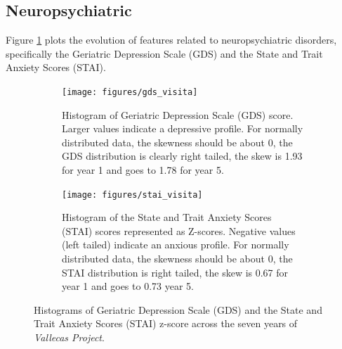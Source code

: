 \documentclass[11pt]{article}
\theoremstyle{definition}
\theoremstyle{remark}
\begin{document}
\subsection{Neuropsychiatric}
\label{sse:neupsy}

Figure \ref{fig:neuropsylong} plots the evolution of features related to neuropsychiatric disorders, specifically the Geriatric Depression Scale (GDS) and the State and Trait Anxiety Scores (STAI). 
\begin{figure}[H]
    \centering
    \begin{subfigure}[t]{0.45\textwidth}
        \centering
        \texttt{[image: figures/gds\_visita]}
        \caption{Histogram of Geriatric Depression Scale (GDS) score. Larger values indicate a depressive profile. For normally distributed data, the skewness should be about 0, the GDS distribution is clearly right tailed, the skew is 1.93 for year 1 and goes to 1.78 for year 5.}%
    \end{subfigure}
    \hfill
    \begin{subfigure}[t]{0.45\textwidth}
        \centering
        \texttt{[image: figures/stai\_visita]}
        \caption{Histogram of the State and Trait Anxiety Scores (STAI) scores represented as Z-scores. Negative values (left tailed) indicate an anxious profile. For normally distributed data, the skewness should be about 0, the STAI distribution is right tailed, the skew is 0.67 for year 1 and goes to 0.73 year 5.} %
    \end{subfigure}%
    \caption{Histograms of Geriatric Depression Scale (GDS) and the State and Trait Anxiety Scores (STAI) z-score across the seven years of \emph{Vallecas Project}.} 
    \label{fig:neuropsylong}
\end{figure}
\end{document}
